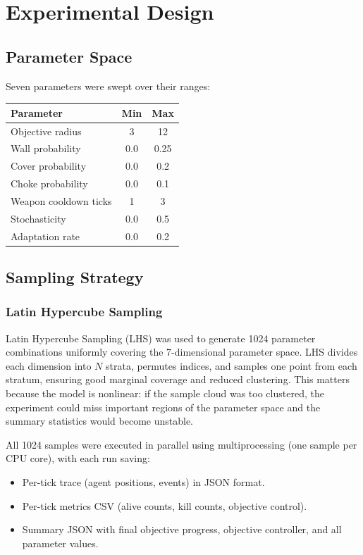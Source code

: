 \documentclass{assignment}
\begin{document}
\section{Experimental Design}

\subsection{Parameter Space}

Seven parameters were swept over their ranges:
\begin{center}
\begin{tabular}{lcc}
  \toprule
  \textbf{Parameter} & \textbf{Min} & \textbf{Max} \\
  \midrule
  Objective radius & 3 & 12 \\
  Wall probability & 0.0 & 0.25 \\
  Cover probability & 0.0 & 0.2 \\
  Choke probability & 0.0 & 0.1 \\
  Weapon cooldown ticks & 1 & 3 \\
  Stochasticity & 0.0 & 0.5 \\
  Adaptation rate & 0.0 & 0.2 \\
  \bottomrule
\end{tabular}
\end{center}

\subsection{Sampling Strategy}

\subsubsection{Latin Hypercube Sampling}
Latin Hypercube Sampling (LHS) was used to generate 1024 parameter combinations uniformly covering the 7-dimensional parameter space. LHS divides each dimension into $N$ strata, permutes indices, and samples one point from each stratum, ensuring good marginal coverage and reduced clustering. This matters because the model is nonlinear: if the sample cloud was too clustered, the experiment could miss important regions of the parameter space and the summary statistics would become unstable.

All 1024 samples were executed in parallel using multiprocessing (one sample per CPU core), with each run saving:
\begin{itemize}
  \item Per-tick trace (agent positions, events) in JSON format.
  \item Per-tick metrics CSV (alive counts, kill counts, objective control).
  \item Summary JSON with final objective progress, objective controller, and all parameter values.
\end{itemize}
\end{document}
